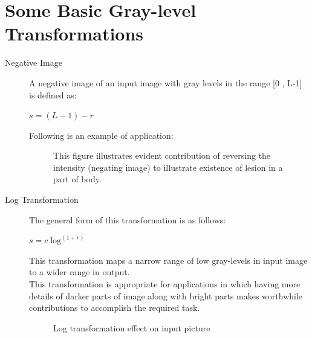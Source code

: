 \documentclass{article}
\begin{document}
\section{Some Basic Gray-level Transformations}
 \begin{description}
 \item [Negative Image] A negative image of an input image with gray levels in the range [0 , L-1] is defined as:\\
 \begin{center}
 $s = (L-1) - r$
 \end{center}
 Following is an example of application:
 \begin{figure}[h]
 \center
{}
\caption{This figure illustrates evident contribution of reversing the intensity (negating image) to illustrate existence of lesion in a part of body.}
 \end{figure}
 
 \item [Log Transformation] The general form of this transformation is as follows:\\
 \begin{center}
 $s = c \log^{(1+r)}$
 \end{center}
 This transformation maps a narrow range of low gray-levels in input image to a wider range in output.\\
 This transformation is appropriate for applications in which having more details of darker parts of image along with bright parts makes worthwhile contributions to accomplish the required task.
 \begin{figure}[h]
 \center
 \caption{Log transformation effect on input picture}
 \end{figure}
 

\end{description}
\end{document}
